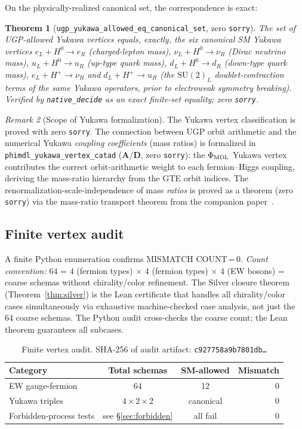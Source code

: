 \documentclass[12pt]{article}
\newtheorem{theorem}{Theorem}[section]
\theoremstyle{remark}
\newtheorem{remark}[theorem]{Remark}
\newcommand{\sorry}{\texttt{sorry}}
\newcommand{\lean}[1]{\texttt{#1}}
\newcommand{\CatAD}{\textbf{A/D}}
\begin{document}
On the physically-realized canonical set, the correspondence is exact:

\begin{theorem}[\lean{ugp\_yukawa\_allowed\_eq\_canonical\_set}, zero \sorry]
\label{thm:gold-exact}
The set of UGP-allowed Yukawa vertices equals, exactly, the six canonical
SM Yukawa vertices
$e_L + H^0 \to e_R$ (charged-lepton mass),
$\nu_L + H^0 \to \nu_R$ (Dirac neutrino mass),
$u_L + H^0 \to u_R$ (up-type quark mass),
$d_L + H^0 \to d_R$ (down-type quark mass),
$e_L + H^+ \to \nu_R$ and
$d_L + H^+ \to u_R$ (the $\mathrm{SU}(2)_L$ doublet-contraction terms of the
same Yukawa operators, prior to electroweak symmetry breaking).
Verified by \lean{native\_decide} as an exact finite-set equality; zero \sorry.
\end{theorem}

\begin{remark}[Scope of Yukawa formalization]
The Yukawa vertex classification is proved with zero \sorry.  The connection
between UGP orbit arithmetic and the numerical Yukawa \emph{coupling coefficients}
(mass ratios) is formalized in \lean{phimdl\_yukawa\_vertex\_catad} ($\CatAD$,
zero \sorry): the $\Phi_{\rm MDL}$ Yukawa vertex contributes the correct orbit-arithmetic
weight to each fermion--Higgs coupling, deriving the mass-ratio hierarchy from the
GTE orbit indices.  The renormalization-scale-independence of mass \emph{ratios}
is proved as a theorem (zero \sorry) via the mass-ratio transport theorem from
the companion paper~\cite{ugp-lean}.
\end{remark}

\subsection{Finite vertex audit}

A finite Python enumeration confirms MISMATCH COUNT\,=\,0.
\emph{Count convention:} 64 = $4$ (fermion types) $\times$ $4$ (fermion types)
$\times$ $4$ (EW bosons) = coarse schemas without chirality/color refinement.
The Silver closure theorem (Theorem~\ref{thm:silver}) is the Lean certificate
that handles all chirality/color cases simultaneously via exhaustive machine-checked
case analysis, not just the 64 coarse schemas.  The Python audit cross-checks
the coarse count; the Lean theorem guarantees all subcases.

\begin{table}[h]
\centering
\begin{tabular}{lccr}
\toprule
Category & Total schemas & SM-allowed & Mismatch \\
\midrule
EW gauge-fermion & 64 & 12 & 0 \\
Yukawa triples & $4 \times 2 \times 2$ & canonical & 0 \\
Forbidden-process tests & see \S\ref{sec:forbidden} & all fail & 0 \\
\bottomrule
\end{tabular}
\caption{Finite vertex audit.
SHA-256 of audit artifact: \texttt{c927758a9b7801db\ldots}}
\label{tab:audit}
\end{table}
\end{document}
